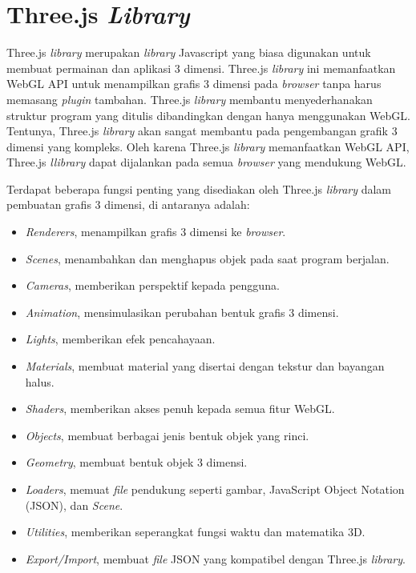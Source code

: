 \section{Three.js \textit{Library}}
\label{sec:latex}
Three.js \textit{library} merupakan \textit{library} Javascript yang biasa digunakan untuk membuat permainan dan aplikasi 3 dimensi. Three.js \textit{library} ini memanfaatkan WebGL API untuk menampilkan grafis 3 dimensi pada \textit{browser} tanpa harus memasang \textit{plugin} tambahan. Three.js \textit{library} membantu menyederhanakan struktur program yang ditulis dibandingkan dengan hanya menggunakan WebGL. Tentunya, Three.js \textit{library} akan sangat membantu pada pengembangan grafik 3 dimensi yang kompleks. Oleh karena Three.js \textit{library} memanfaatkan WebGL API, Three.js \textit{llibrary} dapat dijalankan pada semua \textit{browser} yang mendukung WebGL.

Terdapat beberapa fungsi penting yang disediakan oleh Three.js \textit{library} dalam pembuatan grafis 3 dimensi, di antaranya adalah:
\begin{itemize}
\item \textit{Renderers}, menampilkan grafis 3 dimensi ke \textit{browser}.
\item \textit{Scenes}, menambahkan dan menghapus objek pada saat program berjalan.
\item \textit{Cameras}, memberikan perspektif kepada pengguna.
\item \textit{Animation}, mensimulasikan perubahan bentuk grafis 3 dimensi.
\item \textit{Lights}, memberikan efek pencahayaan.
\item \textit{Materials}, membuat material yang disertai dengan tekstur dan bayangan halus.
\item \textit{Shaders}, memberikan akses penuh kepada semua fitur WebGL.
\item \textit{Objects}, membuat berbagai jenis bentuk objek yang rinci.
\item \textit{Geometry}, membuat bentuk objek 3 dimensi.
\item \textit{Loaders}, memuat \textit{file} pendukung seperti gambar, JavaScript Object Notation (JSON), dan \textit{Scene}.
\item \textit{Utilities}, memberikan seperangkat fungsi waktu dan matematika 3D.
\item \textit{Export/Import}, membuat \textit{file} JSON yang kompatibel dengan Three.js \textit{library}.
\end{itemize}

